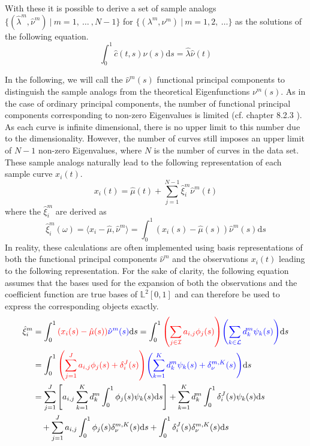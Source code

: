 \documentclass[11pt,twoside,a4paper]{article}
\begin{document}
	With these it is possible to derive a set of sample analogs $\{(\hat{\lambda}^m, \hat{\nu}^m) \: \vert \: m = 1,\: \dots\:, N-1\}$ for $\{(\lambda^m, \nu^m) \: \vert \: m = 1, 2, \:\dots\}$ as the solutions of the following equation. 
	\begin{equation}
		\int_{0}^{1}\hat{c}(t,s)\hat{\nu}(s) \mathrm{d}s = \hat{\lambda} \hat{\nu}(t)
	\end{equation}

	
	In the following, we will call the $\hat{\nu}^m(s)$ functional principal components to distinguish the sample analogs from the theoretical Eigenfunctions $\nu^m(s)$. As in the case of ordinary principal components, the number of functional principal components corresponding to non-zero Eigenvalues is limited (cf. chapter 8.2.3 \cite{ramsay_functional_2005}). As each curve is infinite dimensional, there is no upper limit to this number due to the dimensionality. However, the number of curves still imposes an upper limit of $N-1$ non-zero Eigenvalues, where $N$ is the number of curves in the data set.
	These sample analogs naturally lead to the following representation of each sample curve $x_i(t)$.
	\begin{equation}
		x_i(t) = \hat{\mu}(t) + \sum_{j = 1}^{N-1} \hat{\xi}_{i}^{m} \hat{\nu}^{m}(t)
	\end{equation}
	where the $\hat{\xi}_{i}^m$ are derived as 
	\begin{equation}
		\hat{\xi}_i^m(\omega) = \langle x_i - \hat{\mu}, \hat{\nu}^m\rangle = \int_{0}^{1} \left(x_i(s) - \hat{\mu}(s)\right) \hat{\nu}^m(s) \mathrm{d}s
	\end{equation}
	In reality, these calculations are often implemented using basis representations of both the functional principal components $\hat{\nu}^m$ and the observations $x_i(t)$ leading to the following representation. For the sake of clarity, the following equation assumes that the bases used for the expansion of both the observations and the coefficient function are true bases of $\mathbb{L}^2[0,1]$ and can therefore be used to express the corresponding objects exactly.
	\begin{equation}\label{FPCA_basis_expansion}
		\begin{split}
			\hat{\xi}_{i}^m & = \int_{0}^{1} {\color{red}\left( x_i(s) - \hat{\mu}(s)\right)} {\color{blue}\hat{\nu}^m(s)} \mathrm{d}s
			= \int_{0}^{1} {\color{red}\left(\sum_{j \in \mathcal{I}} a_{i,j} \phi_j(s)\right)} {\color{blue}\left(\sum_{k \in \mathcal{L}} d_{k}^m \psi_{k}(s)\right)} \mathrm{d}s \\
			& = \int_{0}^{1} {\color{red}\left(\sum_{j = 1}^{J} a_{i,j} \phi_j(s) + \delta_i^J(s)\right)} {\color{blue}\left(\sum_{k = 1}^{K} d_{k}^m \psi_{k}(s) + \delta_{\nu}^{m,K}(s)\right)} \mathrm{d}s \\
			& = \sum_{j = 1}^{J} \left[a_{i,j}\sum_{k = 1}^{K} d_{k}^m \int_{0}^{1} \phi_j(s) \psi_{k}(s)\mathrm{d}s \right] +  \sum_{k = 1}^{K} d_{k}^m \int_{0}^{1} \delta_i^J(s) \psi_{k}(s) \mathrm{d}s \\
			& \quad + \sum_{j = 1}^{J} a_{i,j} \int_{0}^{1}\phi_j(s) \delta_{\nu}^{m,K}(s) \mathrm{d}s + \int_{0}^{1} \delta_i^J(s) \delta_{\nu}^{m,K}(s) \mathrm{d}s
		\end{split}
	\end{equation}
\end{document}
